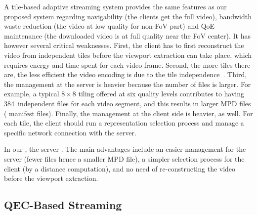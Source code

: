 A tile-based adaptive streaming system provides the same features as
our proposed system regarding navigability (the clients get the full
video), bandwidth waste reduction (the video at low quality for
non-\ac{FoV} part) and \ac{QoE} maintenance (the downloaded video is
at full quality near the \ac{FoV} center). It has however several
critical weaknesses. First, the client has to first reconstruct the
video from independent tiles before the viewport extraction can take
place, which requires energy and time spent for each video frame.
Second, the more tiles there are, the less efficient the video
encoding is due to the tile
independence~\cite{sanchez_compressed_2015}. Third, the management at
the server is heavier because the number of files is larger. For
example, a typical $8\times8$ tiling offered at six quality levels
contributes to having 384~independent files for each video segment,
and this results in larger \ac{MPD} files ( manifest
files). Finally, the management at the client side is heavier, as
well. For each tile, the client should run a representation selection
process and manage a specific network connection with the server.

In our , the server 
.
The main advantages include
an easier management for the server (fewer files hence a smaller
\ac{MPD} file), a simpler selection process for the client (by a
distance computation), and no need of re-constructing the video before
the viewport extraction.

\subsection{QEC-Based Streaming}

